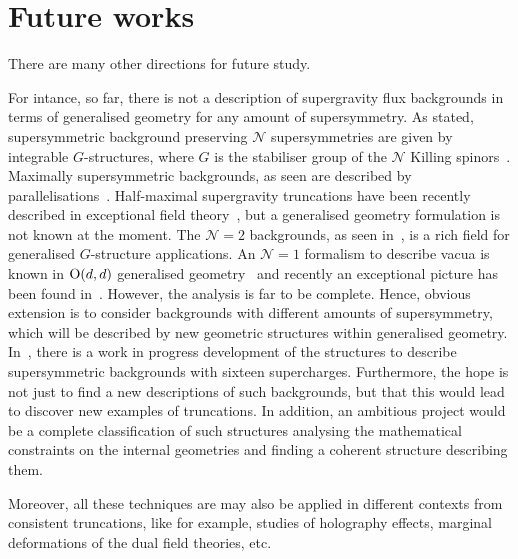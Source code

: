 \documentclass[debug]{phd}
\begin{document}
	\section*{Future works}
		There are many other directions for future study.
		
		For intance, so far, there is not a description of supergravity flux backgrounds in terms of generalised geometry for any amount of supersymmetry.
		As stated, supersymmetric background preserving $\mathcal{N}$ supersymmetries are given by integrable $G$-structures, where $G$ is the stabiliser group of the $\mathcal{N}$ Killing spinors~\cite{AndCharSpecHol}.
		Maximally supersymmetric backgrounds, as seen are described by parallelisations~\cite{spheres, Baguet:2015sma}.
		Half-maximal supergravity truncations have been recently described in exceptional field theory~\cite{Malek:2017cjn}, but a generalised geometry formulation is not known at the moment.
		The $\mathcal{N}=2$ backgrounds, as seen in~\cite{AshmoreESE, AshmoreECY, Grana:2009im, Malek:2016bpu}, is a rich field for generalised $G$-structure applications.
		An $\mathcal{N}=1$ formalism to describe vacua is known in $\mathrm{O}(d,d)$ generalised geometry~\cite{petrini2, Grana:2005sn, Grana:2006kf} and recently an exceptional picture has been found in~\cite{CoimbraN1}. 
		However, the analysis is far to be complete.
		Hence, obvious extension is to consider backgrounds with different amounts of supersymmetry, which will be described by new geometric structures within generalised geometry.
		In~\cite{oscar5}, there is a work in progress development of the structures to describe supersymmetric backgrounds with sixteen supercharges.
		Furthermore, the hope is not just to find a new descriptions of such backgrounds, but that this would lead to discover new examples of truncations.
		In addition, an ambitious project would be a complete classification of such structures analysing the mathematical constraints on the internal geometries and finding a coherent structure describing them.
		
		Moreover, all these techniques are may also be applied in different contexts from consistent truncations, like for example, studies of holography effects, marginal deformations of the dual field theories, etc.
		
\end{document}
